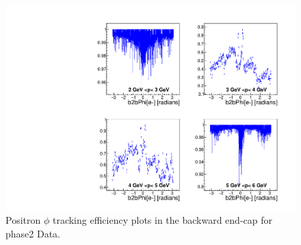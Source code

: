 \documentclass[a4paper,11pt,twosided,final,german,openbib,pdftex,listof=totoc,bibliography=totoc]{scrbook}
\begin{document}
\begin{appendix}
\begin{figure}[!htbp]
	\centering
	\includegraphics[width=\textwidth]{Plots/master/xPMPhiepEC_Data}
	\caption[Momentum $\phi$ Positron Backward End-Cap Efficiency Phase2 Data]{Positron $\phi$ tracking efficiency plots in the backward end-cap for phase2 Data.}
	\label{plt:PMPhiepEC_Data}
\end{figure}



\clearpage






\end{appendix}
\end{document}
